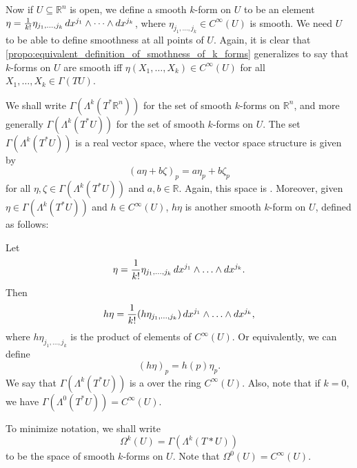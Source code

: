 \documentclass[notoc,notitlepage]{tufte-book}
\begin{document}
Now if $U \subseteq \mathbb{R}^n$ is open, we define a smooth $k$-form on $U$ to be an element
$\eta = \frac{1}{k!} \eta_{j_1, \ldots, j_k} \mathop{}\!d{x^{j_1}} \land \dots \land \mathop{}\!d{x^{j_k}}$, where
$\eta_{j_1, \ldots, j_k} \in C^\infty(U)$ is smooth. We need $U$ to be able to define smoothness
at all points of $U$. Again, it is clear that 
\cref{propo:equivalent_definition_of_smothness_of_k_forms} generalizes to say that $k$-forms on $U$
are smooth iff $\eta(X_1, \ldots, X_k) \in C^\infty(U)$ for all $X_1, \ldots, X_k \in \Gamma(TU)$.

We shall write $\Gamma(\Lambda^k(T^* \mathbb{R}^n))$ for the set of smooth $k$-forms on 
$\mathbb{R}^n$, and more generally $\Gamma(\Lambda^k(T^* U))$ for the set of smooth $k$-forms
on $U$. The set $\Gamma(\Lambda^k(T^* U))$ is a real vector space, where the vector space structure
is given by
\begin{equation*}
  (a \eta + b \zeta)_p = a \eta_p + b \zeta_p
\end{equation*}
for all $\eta, \zeta \in \Gamma(\Lambda^k(T^* U))$ and $a, b \in \mathbb{R}$. Again, this space is
. Moreover, given $\eta \in \Gamma(\Lambda^k(T^* U))$ and 
$h \in C^\infty(U)$, $h \eta$ is another smooth $k$-form on $U$, defined as follows:

Let
\begin{equation*}
  \eta = \frac{1}{k!} \eta_{j_1, \ldots, j_k} \mathop{}\!d{x^{j_1}} \land \hdots \land \mathop{}\!d{x^{j_k}}.
\end{equation*}
Then
\begin{equation*}
  h \eta = \frac{1}{k!} (h\eta_{j_1, \ldots, j_k}) \mathop{}\!d{x^{j_1}} \land \hdots \land \mathop{}\!d{x^{j_k}},
\end{equation*}
where $h\eta_{j_1, \ldots, j_k}$ is the product of elements of $C^{\infty}(U)$. Or equivalently,
we can define
\begin{equation}\label{eq:k_form_with_scalar}
  (h \eta)_p = h(p) \eta_p.
\end{equation}
We say that $\Gamma(\Lambda^k(T^* U))$ is a  over the ring $C^\infty(U)$. Also,
note that if $k = 0$, we have $\Gamma(\Lambda^0(T^* U)) = C^\infty(U)$.

\begin{note}[Notation]
  To minimize notation, we shall write
  \begin{equation*}
    \Omega^k(U) = \Gamma(\Lambda^k(T*U))
  \end{equation*}
  to be the space of smooth $k$-forms on $U$. Note that $\Omega^0(U) = C^\infty(U)$.
\end{note}
\end{document}
